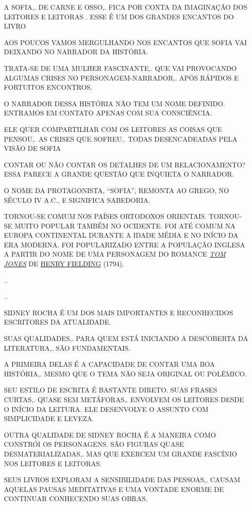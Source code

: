 \documentclass{extarticle}
\begin{document}
A SOFIA,. DE CARNE E OSSO,. FICA POR CONTA DA IMAGINAÇÃO DOS LEITORES E
LEITORAS . ESSE É UM DOS GRANDES ENCANTOS DO LIVRO
 
AOS POUCOS VAMOS MERGULHANDO NOS ENCANTOS QUE SOFIA VAI DEIXANDO NO
NARRADOR DA HISTÓRIA.
 
TRATA-SE DE UMA MULHER FASCINANTE,. QUE VAI PROVOCANDO ALGUMAS CRISES NO
PERSONAGEM-NARRADOR,. APÓS RÁPIDOS E FORTUITOS ENCONTROS.
 
O NARRADOR DESSA HISTÓRIA NÃO TEM UM NOME DEFINIDO. ENTRAMOS EM CONTATO
APENAS COM SUA CONSCIÊNCIA.
 
ELE QUER COMPARTILHAR COM OS LEITORES AS COISAS QUE PENSOU,. AS CRISES
QUE SOFREU,. TODAS DESENCADEADAS PELA VISÃO DE SOFIA
 
CONTAR OU NÃO CONTAR OS DETALHES DE UM RELACIONAMENTO? ESSA PARECE A
GRANDE QUESTÃO QUE INQUIETA O NARRADOR.

O NOME DA PROTAGONISTA, ``SOFIA'', REMONTA AO GREGO, NO SÉCULO IV A.C.,
E SIGNIFICA SABEDORIA.
 
TORNOU-SE COMUM NOS PAÍSES ORTODOXOS ORIENTAIS. TORNOU-SE MUITO POPULAR
TAMBÉM NO OCIDENTE. FOI ATÉ COMUM NA EUROPA CONTINENTAL DURANTE A IDADE
MÉDIA E NO INÍCIO DA ERA MODERNA. FOI POPULARIZADO ENTRE A POPULAÇÃO
INGLESA A PARTIR DO NOME DE UMA PERSONAGEM DO ROMANCE
\href{https://pt.wikipedia.org/wiki/The_History_of_Tom_Jones,_a_Foundling}{\emph{TOM
JONES}} DE \href{https://pt.wikipedia.org/wiki/Henry_Fielding}{HENRY
FIELDING} (1794).

..

..

SIDNEY ROCHA É UM DOS MAIS IMPORTANTES E RECONHECIDOS ESCRITORES DA
ATUALIDADE.
 
SUAS QUALIDADES,. PARA QUEM ESTÁ INICIANDO A DESCOBERTA DA LITERATURA,.
SÃO FUNDAMENTAIS.
 
A PRIMEIRA DELAS É A CAPACIDADE DE CONTAR UMA BOA HISTÓRIA,. MESMO QUE O
TEMA NÃO SEJA ORIGINAL OU POLÊMICO.
 
SEU ESTILO DE ESCRITA É BASTANTE DIRETO. SUAS FRASES CURTAS,. QUASE SEM
METÁFORAS,. ENVOLVEM OS LEITORES DESDE O INÍCIO DA LEITURA. ELE
DESENVOLVE O ASSUNTO COM SIMPLICIDADE E LEVEZA.
 
OUTRA QUALIDADE DE SIDNEY ROCHA É A MANEIRA COMO CONSTRÓI OS
PERSONAGENS. SÃO FIGURAS QUASE DESMATERIALIZADAS,. MAS QUE EXERCEM UM
GRANDE FASCÍNIO NOS LEITORES E LEITORAS.~
 
SEUS LIVROS EXPLORAM A SENSIBILIDADE DAS PESSOAS,. CAUSAM AQUELAS PAUSAS
MEDITATIVAS E UMA VONTADE ENORME DE CONTINUAR CONHECENDO SUAS OBRAS.
\end{document}
